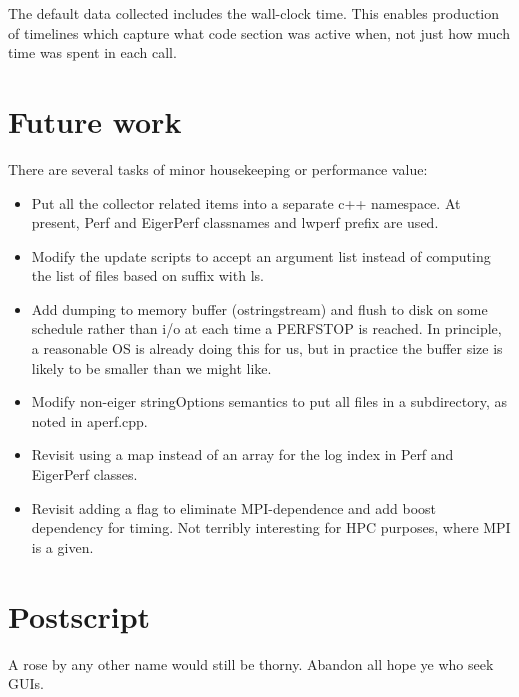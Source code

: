 \documentclass{article}
\begin{document}
The default data collected includes the wall-clock time. This enables production of timelines which capture what code section was active when, not just how much time was spent in each call.


\section{Future work}

There are several tasks of minor housekeeping or performance value:
\begin{itemize}

\item Put all the collector related items into a separate c++ namespace. At present, Perf and EigerPerf classnames and lwperf prefix are used.

\item Modify the update scripts to accept an argument list instead of computing
the list of files based on suffix with ls.

\item Add dumping to memory buffer (ostringstream) and flush to disk on some schedule rather than i/o at each time a PERFSTOP is reached. In principle, a reasonable OS is already doing this for us, but in practice the buffer size is likely to be smaller than we might like.

\item Modify non-eiger stringOptions semantics to put all files in a subdirectory, as noted in aperf.cpp.

\item Revisit using a map instead of an array for the log index in Perf and EigerPerf classes.

\item Revisit adding a flag to eliminate MPI-dependence and add boost dependency for timing. Not terribly interesting for HPC purposes, where MPI is a given.
\end{itemize}

\section{Postscript}

A rose by any other name would still be thorny. Abandon all hope ye who seek GUIs.
\end{document}
